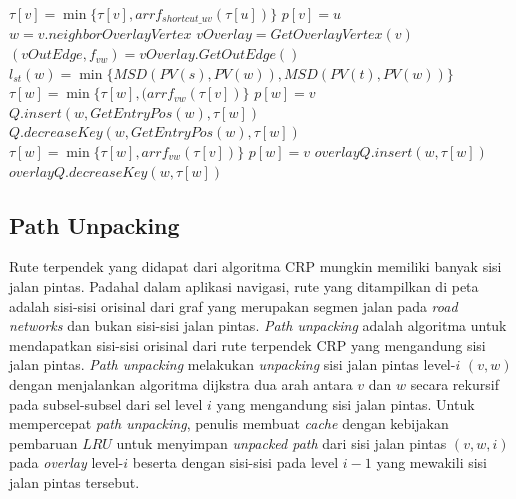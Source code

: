 \begin{algorithm}
{\begin{minipage}{\textwidth}
\begin{algorithmic}[1]
       
            \State $\tau[v]=\min\{\tau[v],arr f_{shortcut\_uv}(\tau[u])\}$  
            \State $p[v]=u$     
            \State $w=v.neighborOverlayVertex$
            \State $vOverlay=GetOverlayVertex(v)$
            \State $(vOutEdge,f_{vw})=vOverlay.GetOutEdge()$
            \State $l_{st}(w)=\min\{MSD(PV(s), PV(w)), MSD(PV(t), PV(w))\}$
             
                    \State $\tau[w]=\min\{\tau[w],(arr f_{vw}(\tau[v])\}$  
                    \State $p[w]=v$     
                        \State $Q.insert(w,GetEntryPos(w),\tau[w])$
                    \Else
                        $Q.decreaseKey(w,GetEntryPos(w),\tau[w])$
                    \EndIf
                \EndIf
            \Else
                    \State $\tau[w]=\min\{\tau[w],arr f_{vw}(\tau[v])\}$  
                    \State $p[w]=v$    
                        \State $overlayQ.insert(w,\tau[w])$
                    \Else
                        $overlayQ.decreaseKey(w,\tau[w])$
                    \EndIf
                \EndIf          
            \EndIf
                
            
        \EndIf
       
    \EndProcedure
\end{algorithmic}
\end{minipage}%
}
\end{algorithm}


\subsection{Path Unpacking}
\label{subsec:tdcrp-path-unpacking}
Rute terpendek yang didapat dari algoritma CRP mungkin memiliki banyak sisi jalan pintas. Padahal dalam aplikasi navigasi, rute yang ditampilkan di peta adalah sisi-sisi orisinal dari graf yang merupakan segmen jalan pada \textit{road networks} dan bukan sisi-sisi jalan pintas. \textit{Path unpacking} adalah algoritma untuk mendapatkan sisi-sisi orisinal dari rute terpendek CRP yang mengandung sisi jalan pintas. \textit{Path unpacking} melakukan \textit{unpacking} sisi jalan pintas level-$i$ $(v,w)$ dengan menjalankan algoritma dijkstra dua arah antara $v$ dan $w$ secara rekursif pada subsel-subsel dari sel level $i$ yang mengandung sisi jalan pintas. Untuk mempercepat \textit{path unpacking}, penulis membuat \textit{cache} dengan kebijakan pembaruan $LRU$ untuk menyimpan \textit{unpacked path} dari sisi jalan pintas $(v,w,i)$ pada \textit{overlay} level-$i$ beserta dengan sisi-sisi pada level $i-1$ yang mewakili sisi jalan pintas tersebut.


